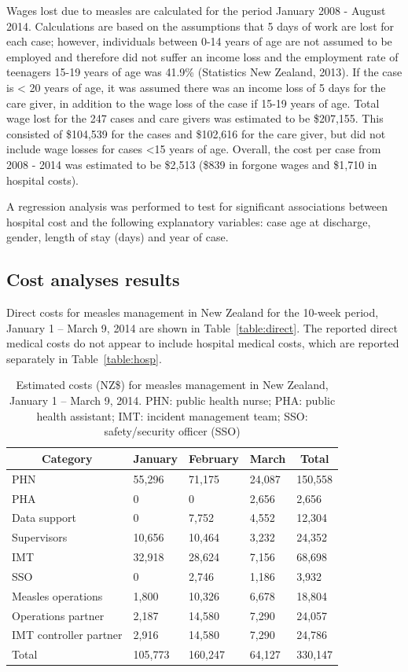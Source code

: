 \documentclass{article}
\begin{document}
Wages lost due to measles are calculated for the period January 2008 - August 2014. Calculations are based on the assumptions that 5 days of work are lost for each case; however, individuals between 0-14 years of age are not assumed to be employed and therefore did not suffer an income loss and the employment rate of teenagers 15-19 years of age was 41.9\%  (Statistics New Zealand, 2013). If the case is < 20 years of age, it was assumed there was an income loss of 5 days for the care giver, in addition to the wage loss of the case if 15-19 years of age. Total wage lost for the 247 cases and care givers was estimated to be \$207,155. This consisted of \$104,539 for the cases and \$102,616 for the care giver, but did not include wage losses for cases <15 years of age. Overall, the cost per case from 2008 - 2014 was estimated to be \$2,513 (\$839 in forgone wages and \$1,710 in hospital costs).

A regression analysis was performed to test for significant associations between hospital cost and the following explanatory variables: case age at discharge, gender, length of stay (days) and year of case.

\subsection{Cost analyses results}

Direct costs for measles management in New Zealand for the 10-week period, January 1 -- March 9, 2014 are shown in  Table~\autoref{table:direct}. The reported direct medical costs do not appear to include hospital medical costs, which are reported separately in Table~\autoref{table:hosp}. 


\begin{table}
\caption{Estimated costs (NZ\$) for measles management in New Zealand, January 1 -- March 9, 2014. PHN: public health nurse; PHA: public health assistant; IMT: incident management team; SSO: safety/security officer (SSO)}
\begin{center}
\begin{tabular}{lllll}
\hline\hline
\multicolumn{1}{c}{Category}&\multicolumn{1}{c}{January}&\multicolumn{1}{c}{February}&\multicolumn{1}{c}{March}&\multicolumn{1}{c}{Total}\tabularnewline
\hline
PHN&55,296&71,175&24,087&150,558\tabularnewline
PHA&0&0&2,656&2,656\tabularnewline
Data support&0&7,752&4,552&12,304\tabularnewline
Supervisors&10,656&10,464&3,232&24,352\tabularnewline
IMT&32,918&28,624&7,156&68,698\tabularnewline
SSO&0&2,746&1,186&3,932\tabularnewline
Measles operations&1,800&10,326&6,678&18,804\tabularnewline
Operations partner&2,187&14,580&7,290&24,057\tabularnewline
IMT controller partner&2,916&14,580&7,290&24,786\tabularnewline
Total&105,773&160,247&64,127&330,147\tabularnewline
\hline
\end{tabular}\end{center}\label{table:direct}
\end{table}
\end{document}
